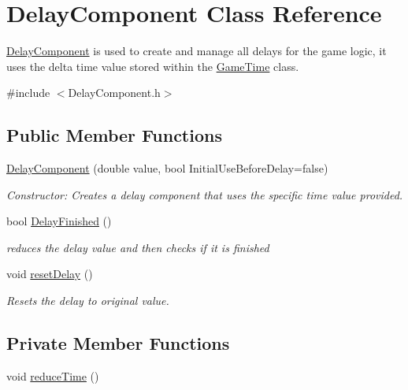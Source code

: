 \hypertarget{class_delay_component}{}\section{Delay\+Component Class Reference}
\label{class_delay_component}


\hyperlink{class_delay_component}{Delay\+Component} is used to create and manage all delays for the game logic, it uses the delta time value stored within the \hyperlink{class_game_time}{Game\+Time} class.  




{\ttfamily \#include $<$Delay\+Component.\+h$>$}

\subsection*{Public Member Functions}
\begin{DoxyCompactItemize}
\item 
\hyperlink{class_delay_component_a14ff75c76f9e0292f52aadd9e58bec81}{Delay\+Component} (double value, bool Initial\+Use\+Before\+Delay=false)
\begin{DoxyCompactList}\small\item\em Constructor\+: Creates a delay component that uses the specific time value provided. \end{DoxyCompactList}\item 
bool \hyperlink{class_delay_component_a8942e663b1a92471ea79f0e7203d30bc}{Delay\+Finished} ()
\begin{DoxyCompactList}\small\item\em reduces the delay value and then checks if it is finished \end{DoxyCompactList}\item 
\mbox{\label{class_delay_component_a539b563338fb30932c96f087dd7a0f5b}} 
void \hyperlink{class_delay_component_a539b563338fb30932c96f087dd7a0f5b}{reset\+Delay} ()
\begin{DoxyCompactList}\small\item\em Resets the delay to original value. \end{DoxyCompactList}\end{DoxyCompactItemize}
\subsection*{Private Member Functions}
\begin{DoxyCompactItemize}
\item 
void \hyperlink{class_delay_component_ac2c7023f723523ba2e42ae047d9b6092}{reduce\+Time} ()
\end{DoxyCompactItemize}
